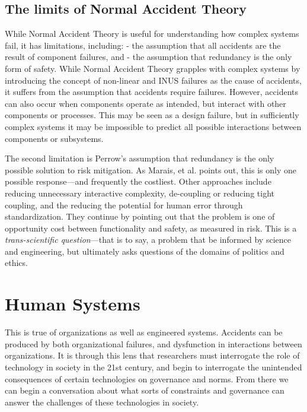 \documentclass[10pt,twocolumn]{article}   	%
\begin{document}
\subsection{The limits of Normal Accident
Theory}\label{the-limits-of-normal-accident-theory}

While Normal Accident Theory is useful for understanding how complex
systems fail, it has limitations, including: - the assumption that all
accidents are the result of component failures, and - the assumption
that redundancy is the only form of safety. While Normal Accident Theory
grapples with complex systems by introducing the concept of non-linear
and INUS failures as the cause of accidents, it suffers from the
assumption that accidents require failures. However, accidents can also
occur when components operate as intended, but interact with other
components or processes.\cite[p.12]{Marais} This may be seen as a design failure,
but in sufficiently complex systems it may be impossible to predict all
possible interactions between components or subsystems.

The second limitation is Perrow's assumption that redundancy is the only
possible solution to risk mitigation. As Marais, et al. points out, this
is only one possible response---and frequently the costliest. Other
approaches include reducing unnecessary interactive complexity,
de-coupling or reducing tight coupling, and the reducing the potential
for human error through standardization.\cite[p.2]{Marais} They continue by
pointing out that the problem is one of opportunity cost between
functionality and safety, as measured in risk. This is a
\emph{trans-scientific question}---that is to say, a problem that be
informed by science and engineering, but ultimately asks questions of
the domains of politics and ethics.\cite[p.3]{Marais}

\section{Human Systems}\label{human-systems}

This is true of organizations as well as engineered systems. Accidents
can be produced by both organizational failures, and dysfunction in
interactions between organizations.\cite[p.12]{Marais} It is through this lens
that researchers must interrogate the role of technology in society in
the 21st century, and begin to interrogate the unintended consequences
of certain technologies on governance and norms. From there we can begin
a conversation about what sorts of constraints and governance can answer
the challenges of these technologies in society.
\end{document}
